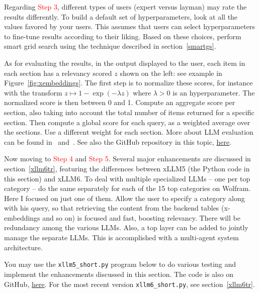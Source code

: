 \documentclass[oneside,10pt]{book}
\begin{document}
Regarding \textcolor{red}{Step 3}, different types of users (expert versus layman) may rate the results differently. To build a default set of hyperparameters, look at all
 the values favored by your users. This assumes that users can select hyperparameters to fine-tune results according to their liking. 
Based on these choices, perform \textcolor{index}{smart grid search} using the technique described in section~\ref{smartgs}.

As for evaluating the results, in the output displayed to the user, each item in each section has a relevancy scored $z$ shown on the left: see example in Figure~\ref{fig:xembeddings}.
The first step is to normalize these scores, for instance with the transform $z\mapsto 1-\exp(-\lambda z)$ where $\lambda>0 $ is an hyperparameter.  The normalized score
 is then between 0 and 1. Compute an aggregate score per section, also taking into account the total number of items returned for a specific section. Then compute a global score for each query, as a weighted average over the sections. Use a different weight for each section. More about
 LLM evaluation can be found in~\cite{24erw2} and~\cite{eval34edr}. See also the GitHub repository in this topic,
 \href{https://github.com/aishwaryanr/awesome-generative-ai-guide/blob/main/free_courses/Applied_LLMs_Mastery_2024/week6_llm_evaluation.md}{here}. 


Now moving to \textcolor{red}{Step 4} and \textcolor{red}{Step 5}. Several major enhancements are discussed in section~\ref{xllm6tr}, 
featuring the differences between xLLM5 (the Python code in this section) and xLLM6. To deal with multiple specialized LLMs -- one per top category -- do the same
 separately  for 
 each of the 15 top categories on Wolfram. Here I focused on just one of them. Allow the user to specify a category along with his query, so that
 retrieving the content from the backend tables (x-embeddings and so on) is focused and fast, boosting relevancy. There will be redundancy among the various LLMs. 
Also, a top layer can be added to jointly manage the separate LLMs. This is accomplished with a 
\textcolor{index}{multi-agent system} architecture.  


You may use the \texttt{xllm5\_short.py} program below to do various testing and implement the enhancements discussed in this section. 
The code is also on GitHub, \href{https://github.com/VincentGranville/Large-Language-Models/blob/main/xllm5/xllm5_short.py}{here}.  For
the most recent version \texttt{xllm6\_short.py}, see section~\ref{xllm6tr}. 
\vspace{1ex}
\end{document}
